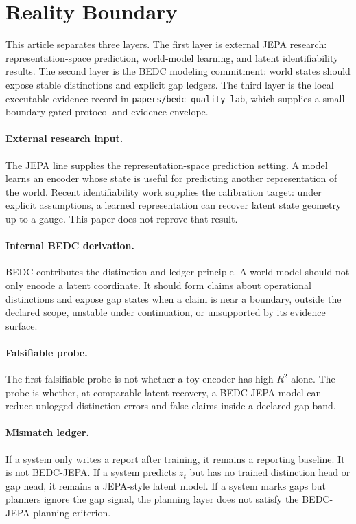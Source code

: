 \section{Reality Boundary}
\label{sec:reality-boundary}

This article separates three layers.  The first layer is external JEPA
research: representation-space prediction, world-model learning, and latent
identifiability results.  The second layer is the BEDC modeling commitment:
world states should expose stable distinctions and explicit gap ledgers.  The
third layer is the local executable evidence record in
\texttt{papers/bedc-quality-lab}, which supplies a small boundary-gated
protocol and evidence envelope.

\paragraph{External research input.}
The JEPA line supplies the representation-space prediction setting.  A model
learns an encoder whose state is useful for predicting another representation
of the world.  Recent identifiability work supplies the calibration target:
under explicit assumptions, a learned representation can recover latent state
geometry up to a gauge.  This paper does not reprove that result.

\paragraph{Internal BEDC derivation.}
BEDC contributes the distinction-and-ledger principle.  A world model should
not only encode a latent coordinate.  It should form claims about operational
distinctions and expose gap states when a claim is near a boundary, outside the
declared scope, unstable under continuation, or unsupported by its evidence
surface.

\paragraph{Falsifiable probe.}
The first falsifiable probe is not whether a toy encoder has high $R^2$ alone.
The probe is whether, at comparable latent recovery, a BEDC-JEPA model can
reduce unlogged distinction errors and false claims inside a declared gap band.

\paragraph{Mismatch ledger.}
If a system only writes a report after training, it remains a reporting
baseline.  It is not BEDC-JEPA.  If a system predicts $z_t$ but has no trained
distinction head or gap head, it remains a JEPA-style latent model.  If a
system marks gaps but planners ignore the gap signal, the planning layer does
not satisfy the BEDC-JEPA planning criterion.
